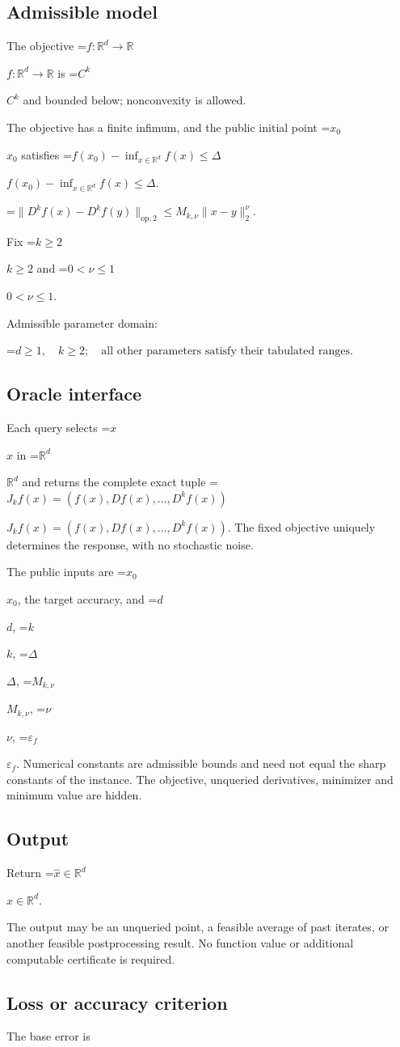 \documentclass[10pt,a4paper]{article}
\newcommand{\AtlasMath}[1]{\par\begingroup\centering\setbox0=\hbox{$\displaystyle #1$}\ifdim\wd0>1.4\linewidth\typeout{ATLAS WIDE FORMULA: \the\wd0}\fi\ifdim\wd0>\linewidth\resizebox{\linewidth}{!}{\box0}\else\box0\fi\par\endgroup}
\newcommand{\AtlasInlineMath}[1]{\begingroup\setbox0=\hbox{$#1$}\ifdim\wd0>.4\linewidth\endgroup\AtlasMath{#1}\else\endgroup$#1$\fi}
\begin{document}
\subsection{Admissible model}
The objective \AtlasInlineMath{f:\mathbb{R}^d\to\mathbb{R}} is \AtlasInlineMath{C^k} and bounded below; nonconvexity is allowed.

The objective has a finite infimum, and the public initial point \AtlasInlineMath{x_0} satisfies \AtlasInlineMath{f(x_0)-\inf_{x\in \mathbb{R}^d}f(x)\le\Delta}.


\AtlasMath{\|D^{k}f(x)-D^{k}f(y)\|_{\mathrm{op},2}\le M_{k,\nu}\|x-y\|_{2}^{\nu}.}


Fix \AtlasInlineMath{k\ge2} and \AtlasInlineMath{0<\nu\le1}.

Admissible parameter domain:


\AtlasMath{d\ge1,\quad k\ge2;\quad\text{all other parameters satisfy their tabulated ranges}.}


\subsection{Oracle interface}
Each query selects \AtlasInlineMath{x} in \AtlasInlineMath{\mathbb{R}^d} and returns the complete exact tuple \AtlasInlineMath{J_{k}f(x)=(f(x),Df(x),\ldots,D^{k}f(x))}. The fixed objective uniquely determines the response, with no stochastic noise.

The public inputs are \AtlasInlineMath{x_0}, the target accuracy, and \AtlasInlineMath{d}, \AtlasInlineMath{k}, \AtlasInlineMath{\Delta}, \AtlasInlineMath{M_{k,\nu}}, \AtlasInlineMath{\nu}, \AtlasInlineMath{\varepsilon_f}. Numerical constants are admissible bounds and need not equal the sharp constants of the instance. The objective, unqueried derivatives, minimizer and minimum value are hidden.

\subsection{Output}
Return \AtlasInlineMath{\widehat{x}\in \mathbb{R}^d}.

The output may be an unqueried point, a feasible average of past iterates, or another feasible postprocessing result. No function value or additional computable certificate is required.

\subsection{Loss or accuracy criterion}
The base error is
\end{document}
